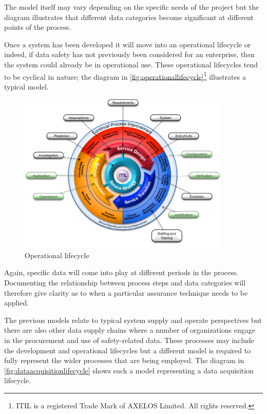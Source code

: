 The model itself may vary depending on the specific needs of the project but the diagram illustrates that different data categories become significant at different points of the process. 

 Once a system has been developed it will move into an operational lifecycle or indeed, if data safety has not previously been considered for an enterprise, then the system could already be in operational use. These operational lifecycles tend to be cyclical in nature; the diagram in \autoref{fig:operationallifecycle}\footnote{ITIL is a registered Trade Mark of AXELOS Limited. All rights reserved.} illustrates a typical model.

\begin{figure}[htbp]
  \centering
  \includegraphics[width=0.9\textwidth]{images/operationallifecycleflat}
  \caption{Operational lifecycle}
  \label{fig:operationallifecycle}
\end{figure}

Again, specific data  will come into play at different periods in the process. Documenting the relationship between process steps and data categories will therefore give clarity as to when a particular assurance technique needs to be applied.

 The previous models relate to typical system supply and operate perspectives but there are also other data supply chains where a number of organizations engage in the procurement and use of safety-related data. These processes may include the development and operational lifecycles but a different model is required to fully represent the wider processes that are being employed. The diagram in \autoref{fig:dataacquisitionlifecycle} shows such a model representing a data acquisition lifecycle.

